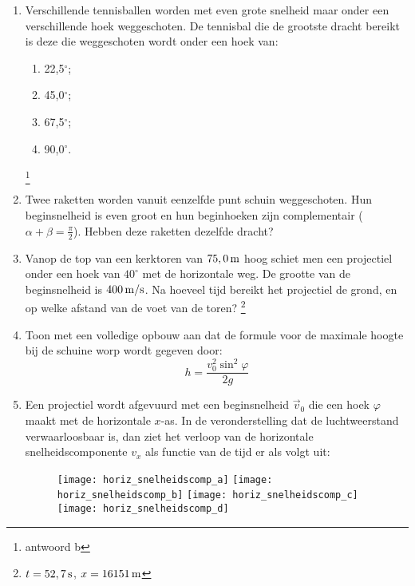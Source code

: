 \documentclass{ximera}
\begin{document}
\begin{enumerate}
\item Verschillende tennisballen worden met even grote snelheid maar
onder een verschillende hoek weggeschoten. De tennisbal die de
grootste dracht bereikt is deze die weggeschoten wordt onder een
hoek van:
\begin{enumerate}
\item 22,5$^\circ$;
\item 45,0$^\circ$;
\item 67,5$^\circ$;
\item 90,0$^\circ$.
\end{enumerate}
\footnote{antwoord b}

\item Twee raketten worden vanuit eenzelfde punt schuin
weggeschoten. Hun beginsnelheid is even groot en hun beginhoeken
zijn complementair ($\alpha+\beta=\frac{\pi}{2}$). Hebben deze
raketten dezelfde dracht?

\item Vanop de top van een kerktoren van $75,0\rm\,m$ hoog schiet
men een projectiel onder een hoek van $40^\circ$ met de horizontale
weg. De grootte van de beginsnelheid is $400\rm\,m/s$. Na hoeveel
tijd bereikt het projectiel de grond, en op welke afstand van de
voet van de toren? \footnote{$t=52,7\rm\,s$, $x=16151\rm\,m$}

\item Toon met een volledige opbouw aan dat de formule voor de
maximale hoogte bij de schuine worp wordt gegeven door:
\begin{displaymath}
h=\frac{v_0^2\sin^2{\varphi}}{2g}
\end{displaymath}

\item Een projectiel wordt afgevuurd met een beginsnelheid
$\vec{v}_0$ die een hoek $\varphi$ maakt met de horizontale
\mbox{$x$-as}.
In de veronderstelling dat de luchtweerstand verwaarloosbaar is, dan
ziet het verloop van de horizontale snelheidscomponente $v_x$ als
functie van de tijd er als volgt uit:
\begin{figure}[h]
\begin{flushright}
\texttt{[image: horiz\_snelheidscomp\_a]}
\texttt{[image: horiz\_snelheidscomp\_b]}
\texttt{[image: horiz\_snelheidscomp\_c]}
\texttt{[image: horiz\_snelheidscomp\_d]}
\end{flushright}
\end{figure}


\end{enumerate}
\end{document}
